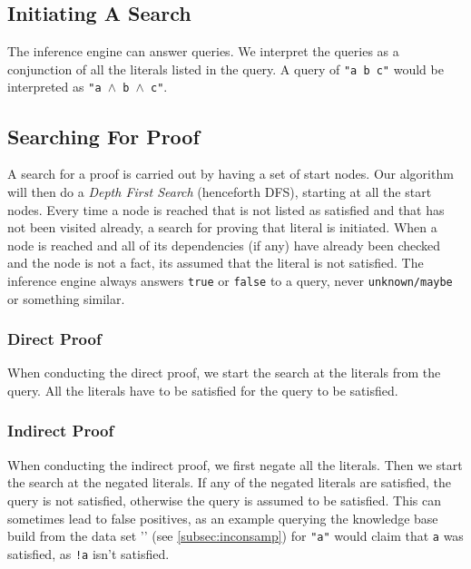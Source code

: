 \documentclass[11pt]{article}
\begin{document}
\subsection{Initiating A Search}
The inference engine can answer queries. We interpret the queries as a conjunction of all the literals listed in the query. A query of {\tt "a b c"} would be interpreted as {\tt "a $\wedge$ b $\wedge$ c"}.

\subsection{Searching For Proof}
A search for a proof is carried out by having a set of start nodes. Our algorithm will then do a \emph{Depth First Search} (henceforth DFS), starting at all the start nodes. Every time a node is reached that is not listed as satisfied and that has not been visited already, a search for proving that literal is initiated. When a node is reached and all of its dependencies (if any) have already been checked and the node is not a fact, its assumed that the literal is not satisfied. The inference engine always answers {\tt true} or {\tt false} to a query, never {\tt unknown/maybe} or something similar.

\subsubsection{Direct Proof}
When conducting the direct proof, we start the search at the literals from the query. All the literals have to be satisfied for the query to be satisfied.

\subsubsection{Indirect Proof}
When conducting the indirect proof, we first negate all the literals. Then we start the search at the negated literals. If any of the negated literals are satisfied, the query is not satisfied, otherwise the query is assumed to be satisfied. This can sometimes lead to false positives, as an example querying the knowledge base build from the data set '' (see \ref{subsec:inconsamp}) for {\tt "a"} would claim that {\tt a} was satisfied, as {\tt !a} isn't satisfied.
\end{document}
